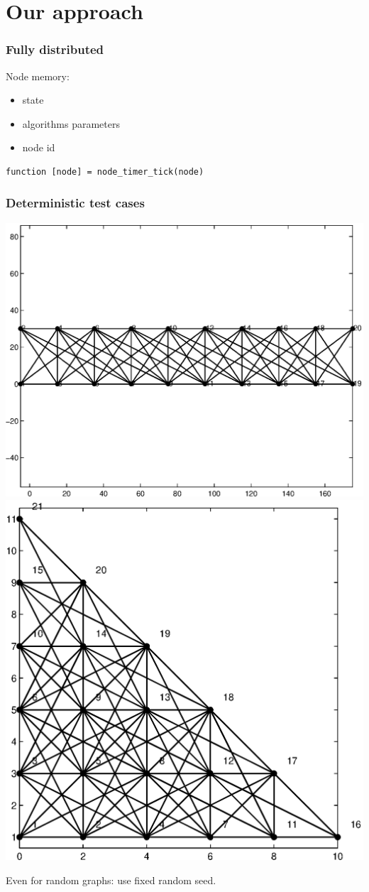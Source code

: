 \documentclass{beamer}
\begin{document}
\section{Our approach}

\begin{frame}[fragile]
    \frametitle{Fully distributed}
    Node memory:
    \begin{itemize}
        \item state
        \item algorithms parameters
        \item node id
    \end{itemize}
    
    \vspace{1cm}
    
    \begin{lstlisting}[lang=MATLAB]
        function [node] = node_timer_tick(node)
    \end{lstlisting}
    
\end{frame}

\begin{frame}
    \frametitle{Deterministic test cases}
    \includegraphics[width=0.5\columnwidth]{schemas/reg1.eps}
    \includegraphics[width=0.5\columnwidth]{schemas/reg3.eps}
    
    Even for random graphs: use fixed random seed.
\end{frame}
\end{document}
